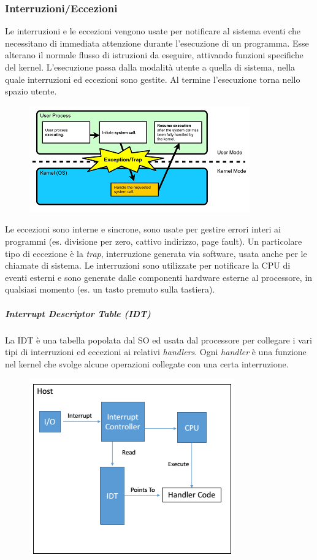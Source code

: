 \documentclass{article}
\begin{document}
\subsubsection{Interruzioni/Eccezioni}
Le interruzioni e le eccezioni vengono usate per notificare al sistema eventi che necessitano di immediata attenzione durante l’esecuzione di un programma.
Esse alterano il normale flusso di istruzioni da eseguire, attivando funzioni specifiche del kernel. L’esecuzione passa dalla modalità utente a quella di sistema, nella quale interruzioni ed eccezioni sono gestite. Al termine l’esecuzione torna nello spazio utente. 
\begin{figure}[H]
    \centering
    \includegraphics[scale=0.8]{img/Virt_tech/8.png}
    \caption{}
\end{figure}\noindent
Le eccezioni sono interne e sincrone, sono usate per gestire errori interi ai programmi (es. divisione per zero, cattivo indirizzo, page fault).
Un particolare tipo di eccezione è la \textit{trap}, interruzione generata via software, usata anche per le chiamate di sistema.
Le interruzioni sono utilizzate per notificare la CPU di eventi esterni e sono generate dalle componenti hardware esterne al processore, in qualsiasi momento (es. un tasto premuto sulla tastiera).

\subparagraph{Interrupt Descriptor Table (IDT)}
La IDT è una tabella popolata dal SO ed usata dal processore per collegare i vari tipi di interruzioni ed eccezioni ai relativi \textit{handlers}.
Ogni \textit{handler} è una funzione nel kernel che svolge alcune operazioni collegate con una certa interruzione. 
\begin{figure}[H]
    \centering
    \includegraphics[scale=0.8]{img/Virt_tech/10.png}
    \caption{}
\end{figure}\noindent
\end{document}
